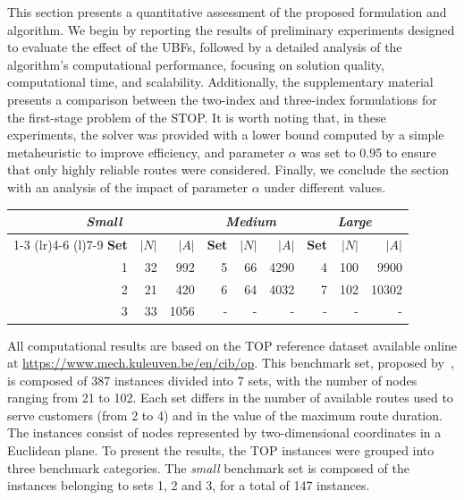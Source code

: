 \documentclass[11pt]{article}
\theoremstyle{definition}
\begin{document}
This section presents a quantitative assessment of the proposed formulation and algorithm. We begin by reporting the results of preliminary experiments designed to evaluate the effect of the UBFs, followed by a detailed analysis of the algorithm’s computational performance, focusing on solution quality, computational time, and scalability. Additionally, the supplementary material presents a comparison between the two-index and three-index formulations for the first-stage problem of the STOP. It is worth noting that, in these experiments, the solver was provided with a lower bound computed by a simple metaheuristic to improve efficiency, and parameter $\alpha$ was set to 0.95 to ensure that only highly reliable routes were considered. Finally, we conclude the section with an analysis of the impact of parameter $\alpha$ under different values.
%
\begin{center}
\begin{tabular}{rrrrrrrrr}
\toprule
\multicolumn{3}{c}{\emph{Small}}
& \multicolumn{3}{c}{\emph{Medium}}
& \multicolumn{3}{c}{\emph{Large}} \\
\cmidrule(lr){1-3} \cmidrule(lr){4-6} \cmidrule(l){7-9}
\textbf{Set} & \textbf{$|N|$} & \textbf{$|A|$}
& \textbf{Set} & \textbf{$|N|$} & \textbf{$|A|$}
& \textbf{Set} & \textbf{$|N|$} & \textbf{$|A|$} \\
\midrule
1 & 32  & 992
& 5 & 66  & 4290
& 4 & 100 & 9900  \\

2 & 21  & 420
& 6 & 64  & 4032
& 7 & 102 & 10302 \\

3 & 33  & 1056
& - & - & -
& - & - & - \\

\bottomrule
\end{tabular}
\label{tab:instances}
\end{center}
%
All computational results are based on the TOP reference dataset available online at \url{https://www.mech.kuleuven.be/en/cib/op}.
This benchmark set, proposed by~\cite{CHAO1996464}, is composed of 387 instances divided into 7 sets, with the number of nodes ranging from 21 to 102. Each set differs in the number of available routes used to serve customers (from 2 to 4) and in the value of the maximum route duration. The instances consist of nodes represented by two-dimensional coordinates in a Euclidean plane. To present the results, the TOP instances were grouped into three benchmark categories.
%
The \emph{small} benchmark set is composed of the instances belonging to sets 1, 2 and 3, for a total of 147 instances.
\end{document}
